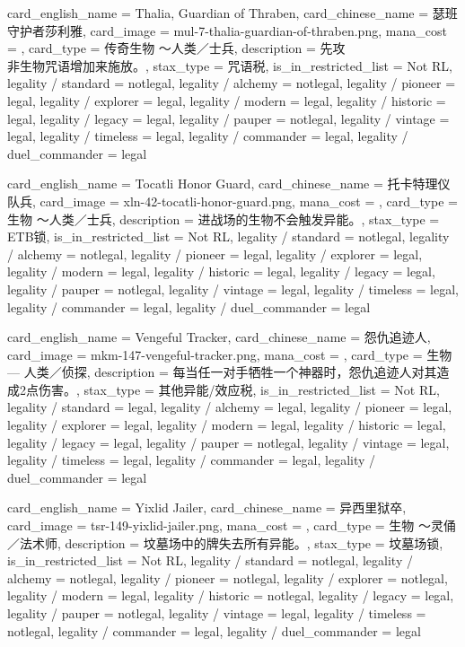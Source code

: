 \documentclass[lang = cn, color = black, 10pt]{AllThatStax}
\begin{document}
\card
{
	card_english_name = {Thalia, Guardian of Thraben},
	card_chinese_name = {瑟班守护者莎利雅},
	card_image = mul-7-thalia-guardian-of-thraben.png,
	mana_cost = ,
	card_type = 传奇生物 ～人类／士兵,
	description = {先攻\\
		非生物咒语增加来施放。},
	stax_type = 咒语税,
	is_in_restricted_list = Not RL,
	legality / standard = notlegal,
	legality / alchemy = notlegal,
	legality / pioneer = legal,
	legality / explorer = legal,
	legality / modern = legal,
	legality / historic = legal,
	legality / legacy = legal,
	legality / pauper = notlegal,
	legality / vintage = legal,
	legality / timeless = legal,
	legality / commander = legal,
	legality / duel_commander = legal
}

\card
{
	card_english_name = {Tocatli Honor Guard},
	card_chinese_name = {托卡特理仪队兵},
	card_image = xln-42-tocatli-honor-guard.png,
	mana_cost = ,
	card_type = 生物 ～人类／士兵,
	description = {进战场的生物不会触发异能。},
	stax_type = ETB锁,
	is_in_restricted_list = Not RL,
	legality / standard = notlegal,
	legality / alchemy = notlegal,
	legality / pioneer = legal,
	legality / explorer = legal,
	legality / modern = legal,
	legality / historic = legal,
	legality / legacy = legal,
	legality / pauper = notlegal,
	legality / vintage = legal,
	legality / timeless = legal,
	legality / commander = legal,
	legality / duel_commander = legal
}

\card
{
	card_english_name = {Vengeful Tracker},
	card_chinese_name = {怨仇追迹人},
	card_image = mkm-147-vengeful-tracker.png,
	mana_cost = ,
	card_type = 生物 — 人类／侦探,
	description = {每当任一对手牺牲一个神器时，怨仇追迹人对其造成2点伤害。},
	stax_type = 其他异能/效应税,
	is_in_restricted_list = Not RL,
	legality / standard = legal,
	legality / alchemy = legal,
	legality / pioneer = legal,
	legality / explorer = legal,
	legality / modern = legal,
	legality / historic = legal,
	legality / legacy = legal,
	legality / pauper = notlegal,
	legality / vintage = legal,
	legality / timeless = legal,
	legality / commander = legal,
	legality / duel_commander = legal
}

\card
{
	card_english_name = {Yixlid Jailer},
	card_chinese_name = {异西里狱卒},
	card_image = tsr-149-yixlid-jailer.png,
	mana_cost = ,
	card_type = 生物 ～灵俑／法术师,
	description = {坟墓场中的牌失去所有异能。},
	stax_type = 坟墓场锁,
	is_in_restricted_list = Not RL,
	legality / standard = notlegal,
	legality / alchemy = notlegal,
	legality / pioneer = notlegal,
	legality / explorer = notlegal,
	legality / modern = legal,
	legality / historic = notlegal,
	legality / legacy = legal,
	legality / pauper = notlegal,
	legality / vintage = legal,
	legality / timeless = notlegal,
	legality / commander = legal,
	legality / duel_commander = legal
}
\end{document}
